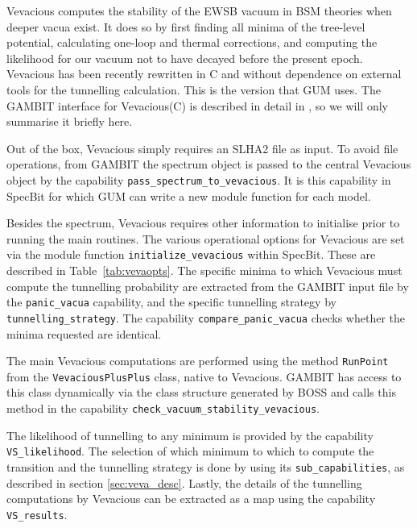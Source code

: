\documentclass[pdftex,twocolumn,epjc3_preprint,runningheads]{svjour3}
\renewcommand{\_}{\discretionary{\underscore}{}{\underscore}}
\newcommand\cpp[1]{{\lstinline!#1!}}  %
\newcommand\yaml[1]{{\lstset{style=yaml}\lstinline!#1!\lstset{style=cpp}}}
\newcommand{\gambit}{\textsf{GAMBIT}\xspace}
\newcommand{\specbit}{\textsf{SpecBit}\xspace}
\newcommand{\BOSS}{\textsf{BOSS}\xspace}
\newcommand{\GB}{\gambit}
\newcommand{\gum}{\textsf{GUM}\xspace}
\newcommand{\veva}{\textsf{Vevacious}\xspace}
\newcommand\xx{\raisebox{0.2ex}{\smaller ++}\xspace}
\begin{document}
\veva computes the stability of the EWSB vacuum in BSM theories when deeper vacua exist. It does so by first finding all minima of the tree-level potential, calculating one-loop and thermal corrections, and computing the likelihood for our vacuum not to have decayed before the present epoch. \veva has been recently rewritten in C\xx and without dependence on external tools for the tunnelling calculation. This is the version that \gum uses. The \GB interface for \veva (C\xx) is described in detail in \cite{VS_GUT}, so we will only summarise it briefly here.

Out of the box, \veva simply requires an SLHA2 file as input. To avoid file operations, from \GB the spectrum object is passed to the central \veva object by the capability \cpp{pass_spectrum_to_vevacious}. It is this capability in \specbit for which \gum can write a new module function for each model.

Besides the spectrum, \veva requires other information to initialise prior to running the main routines. The various operational options for \veva are set via the module function \cpp{initialize_vevacious} within \specbit. These are described in Table~\ref{tab:vevaopts}. The specific minima to which \veva must compute the tunnelling probability are extracted from the \GB input file by the \cpp{panic_vacua} capability, and the specific tunnelling strategy by \cpp{tunnelling_strategy}. The capability \cpp{compare_panic_vacua} checks whether the minima requested are identical.

The main \veva computations are performed using the method \cpp{RunPoint} from the \cpp{VevaciousPlusPlus} class, native to \veva. \GB has access to this class dynamically via the class structure generated by \BOSS and calls this method in the capability \cpp{check_vacuum_stability_vevacious}.

The likelihood of tunnelling to any minimum is provided by the capability \cpp{VS_likelihood}. The selection of which minimum to which to compute the transition and the tunnelling strategy is done by using its \yaml{sub_capabilities}, as described in section \ref{sec:veva_desc}. Lastly, the details of the tunnelling computations by \veva can be extracted as a map using the capability \cpp{VS_results}.




\end{document}
